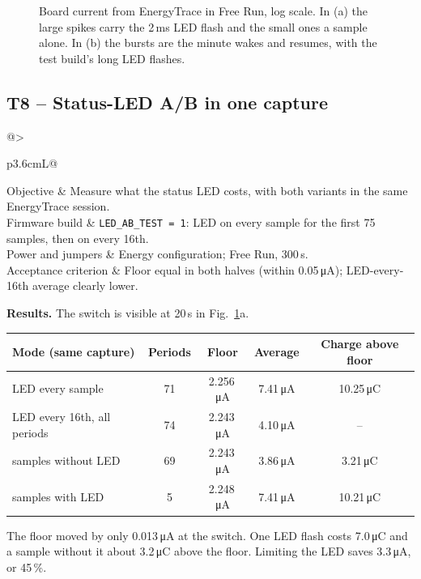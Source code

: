 \documentclass[11pt,a4paper]{article}
\makeatletter
\newcommand{\uA}{\,\si{\micro\ampere}}
\newcommand{\uC}{\,\si{\micro\coulomb}}
\newcommand{\code}[1]{\texttt{#1}}
\newcommand{\testcase}[7]{%
  \subsection{#1 -- #2}\label{#3}
  \noindent\begin{tabularx}{\textwidth}{@{}>{\raggedright\arraybackslash\bfseries}p{3.6cm}L@{}}
  \toprule
  Objective & #4 \\
  Firmware build & #5 \\
  Power and jumpers & #6 \\
  Acceptance criterion & #7 \\
  \bottomrule
  \end{tabularx}\par\medskip}
\makeatother
\begin{document}
\begin{figure}[tbp]
\centering
{}
\caption{Board current from EnergyTrace in Free Run, log scale. In (a) the large spikes carry the 2\,ms LED flash and the small ones a sample alone. In (b) the bursts are the minute wakes and resumes, with the test build's long LED flashes.}
\label{fig:traces}
\end{figure}

\testcase{T8}{Status-LED A/B in one capture}{t:ledab}
  {Measure what the status LED costs, with both variants in the same EnergyTrace session.}
  {\code{LED\_AB\_TEST = 1}: LED on every sample for the first 75 samples, then on every 16th.}
  {Energy configuration; Free Run, 300\,s.}
  {Floor equal in both halves (within 0.05\uA); LED-every-16th average clearly lower.}

\textbf{Results.} The switch is visible at 20\,s in Fig.~\ref{fig:traces}a.
\begin{table}[H]
\centering\small
\begin{tabular}{@{}lcccc@{}}
\toprule
Mode (same capture) & Periods & Floor & Average & Charge above floor \\
\midrule
LED every sample & 71 & 2.256\uA & 7.41\uA & 10.25\uC \\
LED every 16th, all periods & 74 & 2.243\uA & 4.10\uA & -- \\
\quad samples without LED & 69 & 2.243\uA & 3.86\uA & 3.21\uC \\
\quad samples with LED & 5 & 2.248\uA & 7.41\uA & 10.21\uC \\
\bottomrule
\end{tabular}
\end{table}
The floor moved by only 0.013\uA{} at the switch. One LED flash costs 7.0\uC{} and a sample without it about 3.2\uC{} above the floor. Limiting the LED saves 3.3\uA, or 45\,\%.
\end{document}
